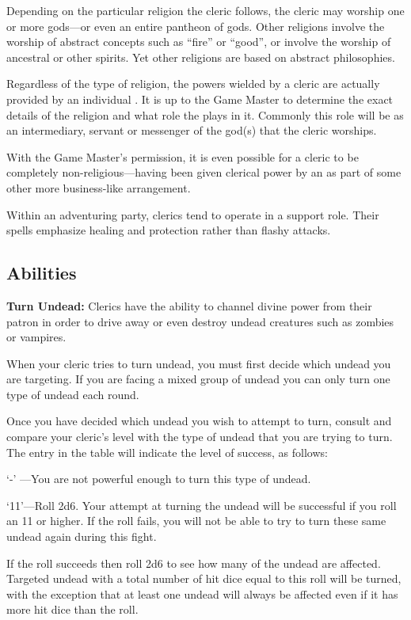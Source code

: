 \begin{multicols*}{2}
Depending on the particular religion the cleric follows, the cleric may worship one or more gods—or even an entire pantheon of gods. Other religions involve the worship of abstract concepts such as “fire” or “good”, or involve the worship of ancestral or other spirits. Yet other religions are based on abstract philosophies.

Regardless of the type of religion, the powers wielded by a cleric are actually provided by an individual . It is up to the Game Master to determine the exact details of the religion and what role the  plays in it. Commonly this role will be as an intermediary, servant or messenger of the god(s) that the cleric worships.

With the Game Master’s permission, it is even possible for a cleric to be completely non-religious—having been given clerical power by an  as part of some other more business-like arrangement.

Within an adventuring party, clerics tend to operate in a support role. Their spells emphasize healing and protection rather than flashy attacks.

\subsection{Abilities}
\textbf{Turn Undead:} Clerics have the ability to channel divine power from their patron in order to drive away or even destroy undead creatures such as zombies or vampires.

When your cleric tries to turn undead, you must first decide which undead you are targeting. If you are facing a mixed group of undead you can only turn one type of undead each round.

Once you have decided which undead you wish to attempt to turn, consult  and compare your cleric’s level with the type of undead that you are trying to turn. The entry in the table will indicate the level of success, as follows:

‘-’ —You are not powerful enough to turn this type of undead.

‘11’—Roll 2d6. Your attempt at turning the undead will be successful if you roll an 11 or higher. If the roll fails, you will not be able to try to turn these same undead again during this fight.

If the roll succeeds then roll 2d6 to see how many of the undead are affected. Targeted undead with a total number of hit dice equal to this roll will be turned, with the exception that at least one undead will always be affected even if it has more hit dice than the roll.


\end{multicols*}
